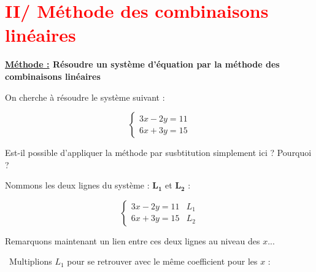 \documentclass[12pt]{article}
\begin{document}
\vspace{10pt}
\section*{\textcolor{red}{II/ Méthode des combinaisons linéaires}}

{\color{RedOrange}\textbf{\underline{Méthode :} Résoudre un système d'équation par la méthode des combinaisons
linéaires}}

\vspace{5pt}
On cherche à résoudre le système suivant : 

$$
\left\{
    \begin{array}{ll}
        3x - 2y =11\\
        6x + 3y = 15
    \end{array}
\right.
$$

\vspace{5pt}
Est-il possible d'appliquer la méthode par susbtitution simplement ici ? Pourquoi ?

\vspace{0.5cm}
{\color{black!45}\dotfill}

\vspace{0.5cm}
{\color{black!45}\dotfill}

\vspace{20pt}

Nommons les deux lignes du système : $\bm{L_1}$ et $\bm{L_2}$ :

$$
\left\{
    \begin{array}{ll}
        3x - 2y =11 & L_1\\
        6x + 3y = 15 & L_2
    \end{array}
\right.
$$

Remarquons maintenant un lien entre ces deux lignes au niveau des $x$... 

\vspace{0.5cm}
{\color{black!45}\dotfill}

\vspace{0.5cm}
{\color{black!45}\dotfill}

\vspace{20pt}

\textbullet \ Multiplions $L_1$ pour se retrouver avec le même coefficient pour les $x$ : 

\vspace{0.5cm}
{\color{black!45}\dotfill}

\vspace{0.5cm}
{\color{black!45}\dotfill}
\end{document}
